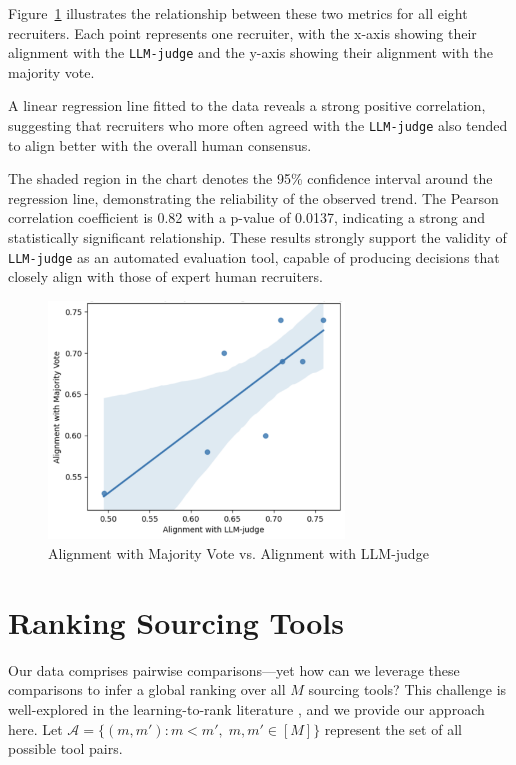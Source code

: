 \documentclass{article}
\begin{document}
Figure~\ref{fig:alignment_chart} illustrates the relationship between these two metrics for all eight recruiters. Each point represents one recruiter, with the x-axis showing their alignment with the \texttt{LLM-judge} and the y-axis showing their alignment with the majority vote.

A linear regression line fitted to the data reveals a strong positive correlation, suggesting that recruiters who more often agreed with the \texttt{LLM-judge} also tended to align better with the overall human consensus.

The shaded region in the chart denotes the 95\% confidence interval around the regression line, demonstrating the reliability of the observed trend. The Pearson correlation coefficient is 0.82 with a p-value of 0.0137, indicating a strong and statistically significant relationship. These results strongly support the validity of \texttt{LLM-judge} as an automated evaluation tool, capable of producing decisions that closely align with those of expert human recruiters.

 


\begin{figure}[h]
\centering
\includegraphics[width=0.7\textwidth]{llm-vs-humans.png}
\caption{Alignment with Majority Vote vs. Alignment with LLM-judge}
\label{fig:alignment_chart}
\end{figure}



\section{Ranking Sourcing Tools}

Our data comprises pairwise comparisons—yet how can we leverage these comparisons to infer a global ranking over all $M$ sourcing tools? This challenge is well-explored in the learning-to-rank literature \cite{liu2009learning}, and we provide our approach here. Let $\mathcal{A} = \{(m, m') : m < m', \; m, m' \in [M]\}$ represent the set of all possible tool pairs.
\end{document}

